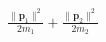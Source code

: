 \documentclass[preview]{standalone}
\begin{document}
\begin{align*}
\frac{\|\mathbf p_1\|^2}{2m_1}+\frac{\|\mathbf p_2\|^2}{2m_2}
\end{align*}
\end{document}
